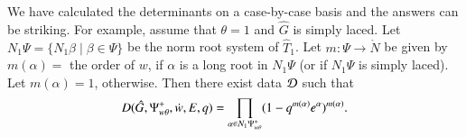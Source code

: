 \begin{remark}
  We have calculated the determinants on a case-by-case basis and the
  answers can be striking.  For example, assume that $\theta=1$ and
  $\hat G$ is simply laced.  Let
  $N_1\Psi=\{N_1\beta\mid \beta\in \Psi\}$ be the norm root system of
  $\hat T_1$.  Let $m:\Psi\to \ring{N}$ be given by $m(\alpha)=$ the
  order of $w$, if $\alpha$ is a long root in $N_1\Psi$ (or if
  $N_1\Psi$ is simply laced).  Let $m(\alpha) = 1$, otherwise.  Then
  there exist data $\mathcal D$ such that
\begin{equation}\label{eqn:laced0}
D(\hat G,\Psi_{w\theta}^+,\dot w,E,q) 
= \prod_{\alpha\in N_1\Psi_{w\theta}^{+}} 
(1- q^{m(\alpha)} e^\alpha)^{m(\alpha)}.
\end{equation}
\end{remark}

